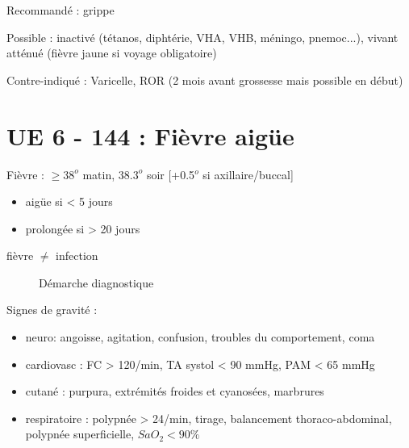 \documentclass{article}
\begin{document}
Recommandé : grippe

Possible : inactivé (tétanos, diphtérie, VHA, VHB, méningo, pnemoc...), vivant
atténué (fièvre jaune si voyage obligatoire)

Contre-indiqué : Varicelle, ROR (2 mois avant grossesse mais possible en début)
\section{UE 6 - 144 : Fièvre aigüe}

Fièvre : \(\ge 38^{o}\) matin, \(38.3^{o}\) soir [+0.5$^{o}$ si axillaire/buccal]
\begin{itemize}
\item aigüe si \textless{} 5 jours
\item prolongée si \textgreater{} 20 jours
\end{itemize}

\danger fièvre \(\neq\) infection

\begin{figure}[htpb]
  \centering
  \caption{Démarche diagnostique}
\end{figure}

Signes de gravité :

\begin{itemize}
\item
  neuro: angoisse, agitation, confusion, troubles du comportement, coma
\item
  cardiovasc : FC > 120/min, TA systol < 90 mmHg,
  PAM < 65 mmHg
\item
  cutané : purpura, extrémités froides et cyanosées, marbrures
\item
  respiratoire : polypnée > 24/min, tirage, balancement
  thoraco-abdominal, polypnée superficielle, \(SaO_2 < 90 \%\)
\end{itemize}
\end{document}
